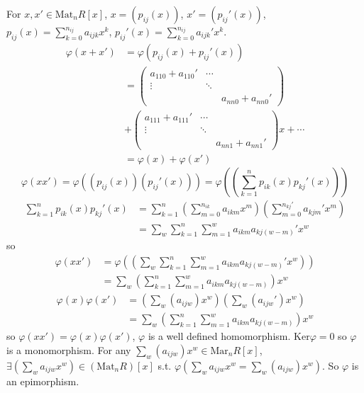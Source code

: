 \begin{answer}
\begin{enumerate}[(a)]
        For $x,x'\in\mathrm{Mat}_{n}R[x]$, $x=(p_{ij}(x))$, $x'=(p_{ij}'(x))$, $p_{ij}(x)=\sum\limits_{k=0}^{n_{ij}}a_{ijk}x^{k}$, $p_{ij}'(x)=\sum\limits_{k=0}^{n_{ij}}a_{ijk}'x^{k}$.\[\begin{aligned}
            \varphi(x+x')&=\varphi(p_{ij}(x)+p_{ij}'(x))\\&=\begin{pmatrix}
                a_{110}+a_{110}'&\cdots & \\\vdots &\ddots& \\ & & a_{nn0}+a_{nn0}'
            \end{pmatrix}\\&+\begin{pmatrix}
                a_{111}+a_{111}'&\cdots & \\\vdots &\ddots& \\ & & a_{nn1}+a_{nn1}'
            \end{pmatrix}x+\cdots\\&=\varphi(x)+\varphi(x')
        \end{aligned}\]
        \[\varphi(x x')=\varphi((p_{ij}(x))(p_{ij}'(x)))=\varphi((\sum_{k=1}^{n}p_{ik}(x)p_{kj}'(x)))\]
        \[\begin{aligned}
            \sum_{k=1}^{n}p_{ik}(x)p_{kj}'(x)&=\sum_{k=1}^{n}(\sum_{m=0}^{n_{ik}}a_{ikm}x^{m})(\sum_{m=0}^{n_{kj}'}a_{kjm}'x^{m})\\&=\sum_{w}\sum_{k=1}^{n}\sum_{m=1}^{w}a_{ikm}a_{kj(w-m)}'x^{w}
        \end{aligned}\]
        so \[\begin{aligned}
            \varphi(xx')&=\varphi((\sum_{w}\sum_{k=1}^{n}\sum_{m=1}^{w}a_{ikm}a_{kj(w-m)}'x^{w}))\\&=\sum_{w}(\sum_{k=1}^{n}\sum_{m=1}^{w}a_{ikm}a_{kj(w-m)})x^{w}
        \end{aligned}\]
        \[\begin{aligned}
            \varphi(x)\varphi(x')&=(\sum_{w}(a_{ijw})x^{w})(\sum_{w}(a_{ijw}')x^{w})\\&=\sum_{w}(\sum_{k=1}^{n}\sum_{m=1}^{w}a_{ikm}a_{kj(w-m)})x^{w}
        \end{aligned}\]
        so $\varphi(xx')=\varphi(x)\varphi(x')$, $\varphi$ is a well defined homomorphism. $\mathrm{Ker}\varphi=0$ so $\varphi$ is a monomorphism. For any $\sum\limits_{w}(a_{ijw})x^{w}\in\mathrm{Mar}_{n}R[x]$, $\exists (\sum\limits_{w}a_{ijw}x^{w})\in(\mathrm{Mat}_{n}R)[x]$ s.t. $\varphi(\sum\limits_{w}a_{ijw}x^{w}=\sum\limits_{w}(a_{ijw})x^{w})$. So $\varphi$ is an epimorphism.
    \end{enumerate}
\end{answer}

